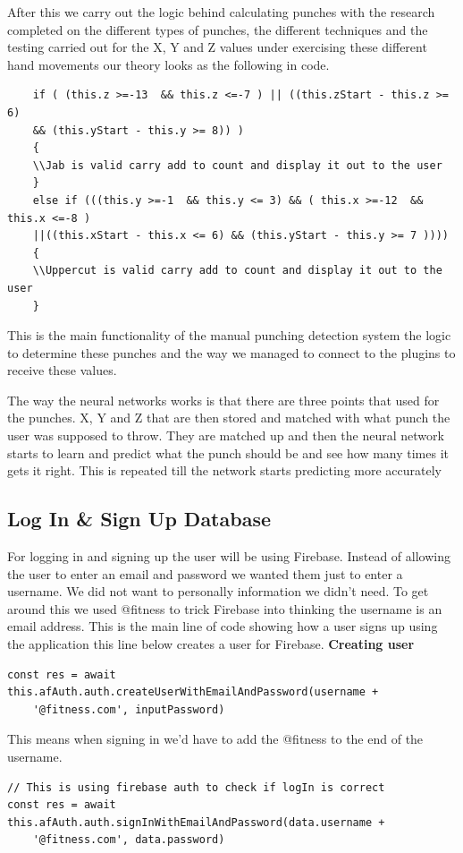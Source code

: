 \documentclass[a4paper,12pt]{report}
\begin{document}
After this we carry out the logic behind calculating punches with the research completed on the different types of punches, the different techniques and the testing carried out for the X, Y and Z values under exercising these different hand movements our theory looks as the following in code.
\begin{verbatim}
    if ( (this.z >=-13  && this.z <=-7 ) || ((this.zStart - this.z >= 6) 
    && (this.yStart - this.y >= 8)) ) 
    {
    \\Jab is valid carry add to count and display it out to the user
    }
    else if (((this.y >=-1  && this.y <= 3) && ( this.x >=-12  && this.x <=-8 )
    ||((this.xStart - this.x <= 6) && (this.yStart - this.y >= 7 )))) 
    {
    \\Uppercut is valid carry add to count and display it out to the user
    }
\end{verbatim}
This is the main functionality of the manual punching detection system the logic to determine these punches and the way we managed to connect to the plugins to receive these values.

The way the neural networks works is that there are three points that used for the punches. X, Y and Z that are then stored and matched with what punch the user was supposed to throw. They are matched up and then the neural network starts to learn and predict what the punch should be and see how many times it gets it right. This is repeated till the network starts predicting more accurately  
\newpage
\subsection{Log In \& Sign Up Database}
For logging in and signing up the user will be using Firebase. Instead of allowing the user to enter an email and password we wanted them just to enter a username. We did not want to personally information we didn't need. To get around this we used @fitness to trick Firebase into thinking the username is an email address. This is the main line of code showing how a user signs up using the application this line below creates a user for Firebase.
\newline
\textbf{ Creating user}
\begin{verbatim}
const res = await this.afAuth.auth.createUserWithEmailAndPassword(username +
    '@fitness.com', inputPassword)
\end{verbatim}

This means when signing in we'd have to add the @fitness to the end of the username. 
\begin{verbatim}
// This is using firebase auth to check if logIn is correct
const res = await this.afAuth.auth.signInWithEmailAndPassword(data.username +
    '@fitness.com', data.password)
\end{verbatim}
\end{document}
